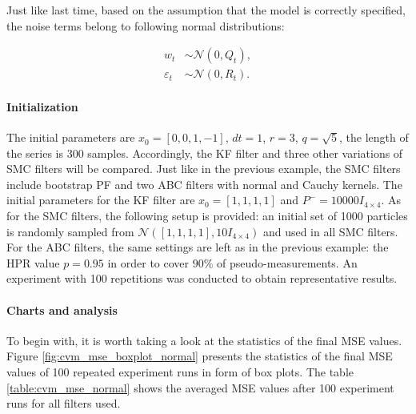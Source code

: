 Just like last time, based on the assumption that the model is correctly specified, the noise terms belong to following normal distributions:

\begin{equation}
\begin{aligned}
w_t &\sim \mathcal{N}(0, Q_t), \\
\varepsilon_t &\sim \mathcal{N}(0, R_t).
\end{aligned}
\end{equation}

\paragraph*{Initialization} The initial parameters are \(x_0=[0,0,1,-1] \), \(dt=1\), \(r=3\), \(q=\sqrt{5}\), the length of the series is 300 samples. Accordingly, the KF filter and three other variations of SMC filters will be compared. Just like in the previous example, the SMC filters include bootstrap PF and two ABC filters with normal and Cauchy kernels. The initial parameters for the KF filter are \(x_0 = [1,1,1,1]\) and \(P^{-} = 10000 I_{4 \times 4} \). As for the SMC filters, the following setup is provided: an initial set of 1000 particles is randomly sampled from \(\mathcal{N}\left(\left[1,1,1,1\right], 10 I_{4 \times 4} \right)\) and used in all SMC filters. For the ABC filters, the same settings are left as in the previous example: the HPR value \(p = 0.95\) in order to cover \(90\%\) of pseudo-measurements. An experiment with 100 repetitions was conducted to obtain representative results.

\paragraph*{Charts and analysis} 
To begin with, it is worth taking a look at the statistics of the final MSE values. Figure \ref{fig:cvm_mse_boxplot_normal} presents the statistics of the final MSE values of 100 repeated experiment runs in form of box plots. The table \ref{table:cvm_mse_normal} shows the averaged MSE values after 100 experiment runs for all filters used.


